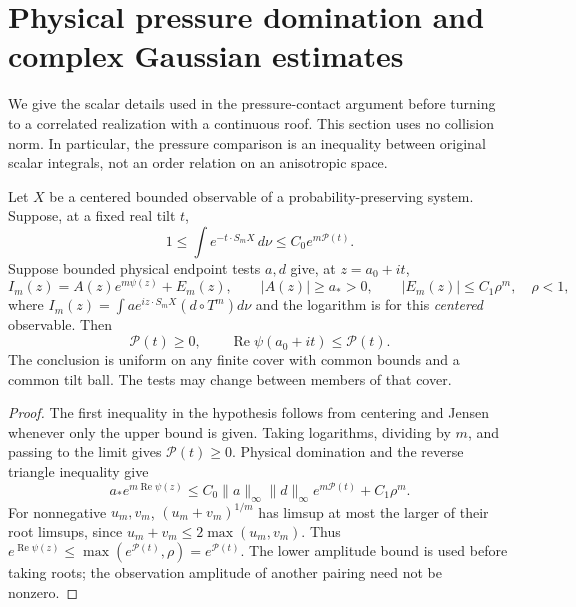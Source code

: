 \section{Physical pressure domination and complex Gaussian estimates}
\label{sec:v59-contact-details}
We give the scalar details used in the pressure-contact argument before
turning to a correlated realization with a continuous roof. This section
uses no collision norm. In particular, the pressure comparison is an
inequality between original scalar integrals, not an order relation on
an anisotropic space.

\begin{lemma}
\label{lem:v59-physical-root}
Let $X$ be a centered bounded observable of a probability-preserving
system. Suppose, at a fixed real tilt $t$,
\[
 1\le\int e^{-t\cdot S_mX}\,d\nu\le C_0e^{m\mathscr P(t)}.
\]
Suppose bounded physical endpoint tests $a,d$ give, at $z=a_0+it$,
\[
 I_m(z)=A(z)e^{m\psi(z)}+E_m(z),\qquad
 |A(z)|\ge a_*>0,\qquad |E_m(z)|\le C_1\rho^m,
 \quad\rho<1,
\]
where $I_m(z)=\int a e^{iz\cdot S_mX}(d\circ T^m)d\nu$ and the
logarithm is for this \emph{centered} observable. Then
\begin{equation}\label{eq:v59-physical-root}
 \mathscr P(t)\ge0,\qquad \operatorname{Re}\psi(a_0+it)\le\mathscr P(t).
\end{equation}
The conclusion is uniform on any finite cover with common bounds and a
common tilt ball. The tests may change between members of that cover.
\end{lemma}
\begin{proof}
The first inequality in the hypothesis follows from centering and
Jensen whenever only the upper bound is given. Taking logarithms,
dividing by $m$, and passing to the limit gives $\mathscr P(t)\ge0$.
Physical domination and the reverse triangle inequality give
\[
 a_*e^{m\operatorname{Re}\psi(z)}
 \le C_0\|a\|_\infty\|d\|_\infty e^{m\mathscr P(t)}+C_1\rho^m.
\]
For nonnegative $u_m,v_m$, $(u_m+v_m)^{1/m}$ has limsup at most
the larger of their root limsups, since $u_m+v_m\le2\max(u_m,v_m)$.
Thus $e^{\operatorname{Re}\psi(z)}\le\max(e^{\mathscr P(t)},\rho)
=e^{\mathscr P(t)}$. The lower amplitude bound is used before taking
roots; the observation amplitude of another pairing need not be nonzero.
\end{proof}

